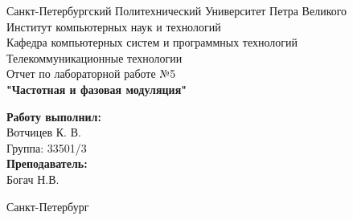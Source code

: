 \documentclass[a4paper]{article}
\begin{document}

\begin{titlepage}	%

	\begin{center}		%

		\large Санкт-Петербургский Политехнический Университет Петра Великого\\
		\large Институт компьютерных наук и технологий \\
		\large Кафедра компьютерных систем и программных технологий\\[6cm]
		
		\huge Телекоммуникационные технологии\\[0.5cm] %
		\large Отчет по лабораторной работе №5 \\[0.2cm]
		\large\textbf{"Частотная и фазовая модуляция"}\\[5cm]

	\end{center}


	\begin{flushright} %
		\begin{minipage}{0.25\textwidth} %
			\begin{flushleft} %

				\large\textbf{Работу выполнил:}\\
				\large Вотчицев К. В.\\
				\large {Группа:} 33501/3\\
				
				\large \textbf{Преподаватель:}\\
				\large Богач Н.В.\

			\end{flushleft}
		\end{minipage}
	\end{flushright}
	
	\vfill %

	\begin{center}
	\large Санкт-Петербург\\
	\large \the\year %
	\end{center} %

\thispagestyle{empty} %
\end{titlepage} %
\end{document}
